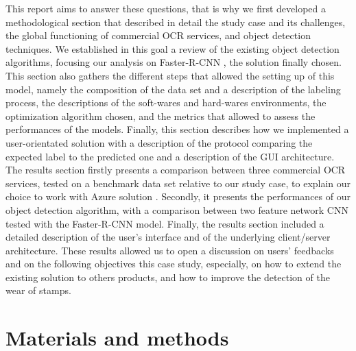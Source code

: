 \documentclass[12pt, french, a4paper]{article} %
\begin{document}
This report aims to answer these questions, that is why we first developed a methodological section that described in detail the study case and its challenges, the global functioning of commercial \gls{OCR} services, and object detection techniques. We established in this goal a review of the existing object detection algorithms, focusing our analysis on Faster-\gls{R-CNN} \cite{ren2015faster}, the solution finally chosen. This section also gathers the different steps that allowed the setting up of this model, namely the composition of the data set and a description of the labeling process, the descriptions of the soft-wares and hard-wares environments, the optimization algorithm chosen, and the metrics that allowed to assess the performances of the models. Finally, this section describes how we implemented a user-orientated solution with a description of the protocol comparing the expected label to the predicted one and a description of the \gls{GUI} architecture. The results section firstly presents a comparison between three commercial \gls{OCR} services, tested on a benchmark data set relative to our study case, to explain our choice to work with Azure solution \cite{AzureOCR}. Secondly, it presents the performances of our object detection algorithm, with a comparison between two feature network  \gls{CNN} tested with the Faster-\gls{R-CNN} model. Finally, the results section included a detailed description of the user's interface and of the underlying client/server architecture. These results allowed us to open a discussion on users' feedbacks and on the following objectives this case study, especially, on how to extend the existing solution to others products, and how to improve the detection of the wear of stamps.



\section{Materials and methods}
\end{document}

